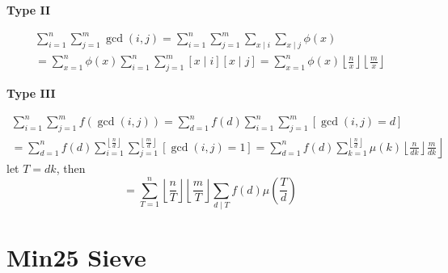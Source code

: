 \textbf{Type II}
\begin{small}
\begin{equation}
	\begin{gathered}
	\sum_{i=1}^n \sum_{j=1}^m \operatorname{gcd}(i, j)=\sum_{i=1}^n \sum_{j=1}^m \sum_{x \mid i} \sum_{x \mid j} \phi(x) \\
	=\sum_{x=1}^n \phi(x) \sum_{i=1}^n \sum_{j=1}^m[x \mid i][x \mid j] 
	=\sum_{x=1}^n \phi(x)\left\lfloor\frac{n}{x}\right\rfloor\left\lfloor\frac{m}{x}\right\rfloor
	\end{gathered}
	\end{equation}
\end{small}

\textbf{Type III}
\begin{small}
\begin{equation}
	\begin{gathered}
	\sum_{i=1}^n \sum_{j=1}^m f(\operatorname{gcd}(i, j))=\sum_{d=1}^n f(d) \sum_{i=1}^n \sum_{j=1}^m[\operatorname{gcd}(i, j)=d] \\
	=\sum_{d=1}^n f(d) \sum_{i=1}^{\left\lfloor\frac{n}{d}\right\rfloor} \sum_{j=1}^{\left\lfloor\frac{m}{d}\right\rfloor}[\operatorname{gcd}(i, j)=1] 
	\left.=\sum_{d=1}^n f(d) \sum_{k=1}^{\left\lfloor\frac{n}{d}\right\rfloor} \mu(k)\left\lfloor\frac{n}{d k}\right\rfloor \frac{m}{d k}\right\rfloor
	\end{gathered}
	\end{equation}
	let $T=dk$, then
	\begin{equation}
		=\sum_{T=1}^n\left\lfloor\frac{n}{T}\right\rfloor\left\lfloor\frac{m}{T}\right\rfloor \sum_{d \mid T} f(d) \mu\left(\frac{T}{d}\right)
		\end{equation}
	\end{small}

 \section{Min25 Sieve}
